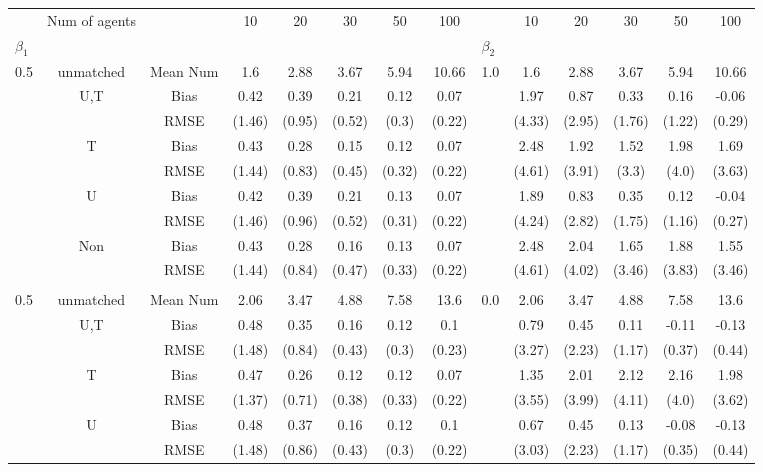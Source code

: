 \begin{tabular}{@{\extracolsep{5pt}}lc|cccccc|lccccc}
\toprule 
 & Num of agents &  & 10 & 20 & 30 & 50 & 100 &  & 10 & 20 & 30 & 50 & 100 \\
$\beta_1$ &  &  &  &  &  &  &  & $\beta_2$ &  &  &  &  &  \\
\midrule 
0.5 & unmatched & Mean Num & 1.6 & 2.88 & 3.67 & 5.94 & 10.66 & 1.0 & 1.6 & 2.88 & 3.67 & 5.94 & 10.66 \\
 & U,T & Bias & 0.42 & 0.39 & 0.21 & 0.12 & 0.07 &  & 1.97 & 0.87 & 0.33 & 0.16 & -0.06 \\
 &  & RMSE & (1.46) & (0.95) & (0.52) & (0.3) & (0.22) &  & (4.33) & (2.95) & (1.76) & (1.22) & (0.29) \\
 & T & Bias & 0.43 & 0.28 & 0.15 & 0.12 & 0.07 &  & 2.48 & 1.92 & 1.52 & 1.98 & 1.69 \\
 &  & RMSE & (1.44) & (0.83) & (0.45) & (0.32) & (0.22) &  & (4.61) & (3.91) & (3.3) & (4.0) & (3.63) \\
 & U & Bias & 0.42 & 0.39 & 0.21 & 0.13 & 0.07 &  & 1.89 & 0.83 & 0.35 & 0.12 & -0.04 \\
 &  & RMSE & (1.46) & (0.96) & (0.52) & (0.31) & (0.22) &  & (4.24) & (2.82) & (1.75) & (1.16) & (0.27) \\
 & Non & Bias & 0.43 & 0.28 & 0.16 & 0.13 & 0.07 &  & 2.48 & 2.04 & 1.65 & 1.88 & 1.55 \\
 &  & RMSE & (1.44) & (0.84) & (0.47) & (0.33) & (0.22) &  & (4.61) & (4.02) & (3.46) & (3.83) & (3.46) \\
 &  &  &  &  &  &  &  &  &  &  &  &  &  \\
0.5 & unmatched & Mean Num & 2.06 & 3.47 & 4.88 & 7.58 & 13.6 & 0.0 & 2.06 & 3.47 & 4.88 & 7.58 & 13.6 \\
 & U,T & Bias & 0.48 & 0.35 & 0.16 & 0.12 & 0.1 &  & 0.79 & 0.45 & 0.11 & -0.11 & -0.13 \\
 &  & RMSE & (1.48) & (0.84) & (0.43) & (0.3) & (0.23) &  & (3.27) & (2.23) & (1.17) & (0.37) & (0.44) \\
 & T & Bias & 0.47 & 0.26 & 0.12 & 0.12 & 0.07 &  & 1.35 & 2.01 & 2.12 & 2.16 & 1.98 \\
 &  & RMSE & (1.37) & (0.71) & (0.38) & (0.33) & (0.22) &  & (3.55) & (3.99) & (4.11) & (4.0) & (3.62) \\
 & U & Bias & 0.48 & 0.37 & 0.16 & 0.12 & 0.1 &  & 0.67 & 0.45 & 0.13 & -0.08 & -0.13 \\
 &  & RMSE & (1.48) & (0.86) & (0.43) & (0.3) & (0.22) &  & (3.03) & (2.23) & (1.17) & (0.35) & (0.44) \\

\end{tabular}
